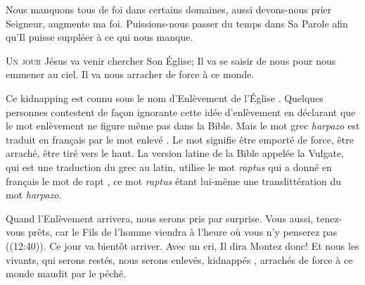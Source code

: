 Nous manquons tous de foi dans certains domaines, aussi devons-nous prier\frcolon{} 
 \Og Seigneur, augmente ma foi. \Fg{}
 Puissions-nous passer du temps dans Sa Parole afin qu'Il puisse
 suppléer à ce qui nous manque.

\dvrule






\lettrine{U}{n jour} Jésus va venir chercher Son Église;
 Il va se saisir de nous pour nous emmener au ciel.
 Il va nous arracher de force à ce monde.

Ce \Og kidnapping \Fg{} est connu sous le nom \Og d'Enlèvement de l'Église \Fg{}.
 Quelques personnes contestent de fa\c{c}on ignorante cette idée d'enlèvement
 en déclarant que le mot \Og enlèvement \Fg{} ne figure même pas dans la Bible.
 Mais le mot grec \emph{harpazo} est traduit en fran\c{c}ais
 par le mot \Og enlevé \Fg{}. Le mot signifie \Og être emporté de force,
 être arraché, être tiré vers le haut. \Fg{}
 La version latine de la Bible appelée la Vulgate, qui est une traduction
 du grec au latin,  utilise
 le mot \emph{raptus} qui a donné en fran\c{c}ais le mot de \Og rapt \Fg{},
 ce mot \emph{raptus} étant lui-même une translittération du mot \emph{harpazo}. 


Quand l'Enlèvement arrivera, nous serons pris par surprise.
 \Og Vous aussi, tenez-vous prêts, car le Fils de l'homme viendra à l'heure
 où vous n'y penserez pas \Fg{}  ((12:40)).
 Ce jour va bientôt arriver. Avec un cri, Il dira\frcolon{} 
 \Og Montez donc! \Fg{} Et nous les vivants, qui serons restés,
 nous serons enlevés, \Og kidnappés \Fg{}, arrachés de force
 à ce monde maudit par le péché.


